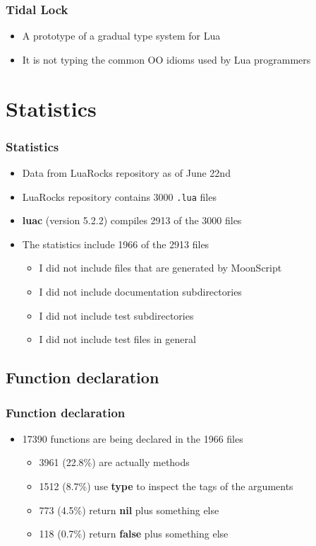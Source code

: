 \documentclass{beamer}
\begin{document}
\begin{frame}
\frametitle{Tidal Lock}
\begin{itemize}
\item A prototype of a gradual type system for Lua
\item It is not typing the common OO idioms used by Lua programmers
\end{itemize}
\end{frame}

\section{Statistics}
\begin{frame}[fragile]
\frametitle{Statistics}
\begin{itemize}
\item Data from LuaRocks repository as of June 22nd
\item LuaRocks repository contains 3000 \verb'.lua' files
\item \textbf{luac} (version 5.2.2) compiles 2913 of the 3000 files
\item The statistics include 1966 of the 2913 files
\begin{itemize}
\item I did not include files that are generated by MoonScript
\item I did not include documentation subdirectories
\item I did not include test subdirectories
\item I did not include test files in general
\end{itemize}
\end{itemize}
\end{frame}

\subsection{Function declaration}
\begin{frame}
\frametitle{Function declaration}
\begin{itemize}
\item 17390 functions are being declared in the 1966 files
\begin{itemize}
\item 3961 (22.8\%) are actually methods
\item 1512 (8.7\%) use \textbf{type} to inspect the tags of the arguments
\item 773 (4.5\%) return \textbf{nil} plus something else
\item 118 (0.7\%) return \textbf{false} plus something else
\end{itemize}
\end{itemize}
\end{frame}
\end{document}
